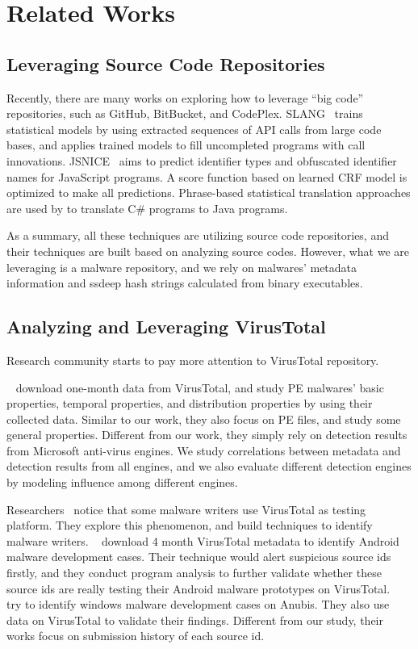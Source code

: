 \section{Related Works}
\label{sec:related}

\subsection{Leveraging Source Code Repositories}

Recently, there are many works on exploring how to leverage ``big code'' repositories, 
such as GitHub, BitBucket, and CodePlex. 
SLANG~\cite{code-completion} trains statistical models by using extracted sequences of API calls from large code bases, 
and applies trained models to fill uncompleted programs with call innovations. 
JSNICE~\cite{big-predicting} aims to predict identifier types and obfuscated identifier names for JavaScript programs. 
A score function based on learned CRF model is optimized to make all predictions. 
Phrase-based statistical translation approaches are used by \citet{big-translation} to translate C\# programs to Java programs. 

As a summary, all these techniques are utilizing source code repositories, 
and their techniques are built based on analyzing source codes. 
However, what we are leveraging is a malware repository, 
and we rely on malwares’ metadata information and ssdeep hash strings calculated from binary executables.


\subsection{Analyzing and Leveraging VirusTotal}

Research community starts to pay more attention to VirusTotal repository. 

~\citet{SongAPsys2016} download one-month data from VirusTotal, 
and study PE malwares’ basic properties, 
temporal properties, and distribution properties by using their collected data.   
Similar to our work, they also focus on PE files, and study some general properties. 
Different from our work, they simply rely on detection results from Microsoft anti-virus engines.
We study correlations between metadata and detection results from all engines, 
and we also evaluate different detection engines by modeling influence among different engines.  

Researchers~\cite{huangvt2016bigdata, neeles} notice that some malware writers use VirusTotal as testing platform.
They explore this phenomenon, and build techniques to identify malware writers. 
~\citet{huangvt2016bigdata} download 4 month VirusTotal metadata to identify Android malware development cases. 
Their technique would alert suspicious source ids firstly, 
and they conduct program analysis to further validate whether 
these source ids are really testing their Android malware prototypes on VirusTotal. 
~\citet{neeles} try to identify windows malware development cases on Anubis. 
They also use data on VirusTotal to validate their findings. 
Different from our study, their works focus on submission history of each source id.  

